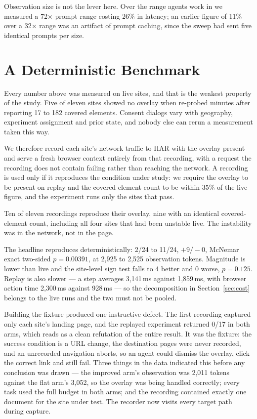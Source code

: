 \documentclass[conference]{IEEEtran}
\begin{document}
Observation size is not the lever here. Over the range agents work in we
measured a 72$\times$ prompt range costing 26\% in latency; an earlier figure
of 11\% over a 32$\times$ range was an artifact of prompt caching, since the
sweep had sent five identical prompts per size.

\section{A Deterministic Benchmark}
\label{sec:bench}

Every number above was measured on live sites, and that is the weakest property
of the study. Five of eleven sites showed no overlay when re-probed minutes
after reporting 17 to 182 covered elements. Consent dialogs vary with
geography, experiment assignment and prior state, and nobody else can rerun a
measurement taken this way.

We therefore record each site's network traffic to HAR with the overlay present
and serve a fresh browser context entirely from that recording, with a request
the recording does not contain failing rather than reaching the network. A
recording is used only if it reproduces the condition under study: we require
the overlay to be present on replay and the covered-element count to be within
35\% of the live figure, and the experiment runs only the sites that pass.

Ten of eleven recordings reproduce their overlay, nine with an identical
covered-element count, including all four sites that had been unstable live.
The instability was in the network, not in the page.

The headline reproduces deterministically: 2/24 to 11/24, $+9/-0$, McNemar
exact two-sided $p = 0.00391$, at 2{,}925 to 2{,}525 observation tokens.
Magnitude is lower than live and the site-level sign test falls to 4 better and
0 worse, $p = 0.125$. Replay is also slower --- a step averages 3{,}141\,ms
against 1{,}859\,ms, with browser action time 2{,}300\,ms against 928\,ms ---
so the decomposition in Section~\ref{sec:cost} belongs to the live runs and the
two must not be pooled.

Building the fixture produced one instructive defect. The first recording
captured only each site's landing page, and the replayed experiment returned
0/17 in both arms, which reads as a clean refutation of the entire result. It
was the fixture: the success condition is a URL change, the destination pages
were never recorded, and an unrecorded navigation aborts, so an agent could
dismiss the overlay, click the correct link and still fail. Three things in the
data indicated this before any conclusion was drawn --- the improved arm's
observation was 2{,}011 tokens against the flat arm's 3{,}052, so the overlay
was being handled correctly; every task used the full budget in both arms; and
the recording contained exactly one document for the site under test. The
recorder now visits every target path during capture.
\end{document}
